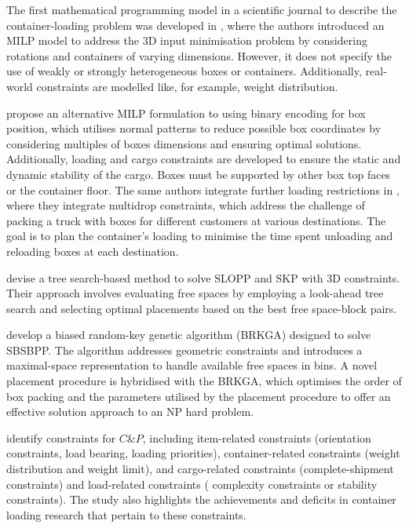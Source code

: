 The first mathematical programming model in a scientific journal to describe the container-loading problem was developed in \autocite{Chen1995EUROPEANProblem}, where the authors introduced an MILP model to address the 3D  input minimisation problem by considering rotations and containers of varying dimensions. However, it does not specify the use of weakly or strongly heterogeneous boxes or containers. Additionally, real-world constraints are modelled like, for example, weight distribution.

\autocite{Junqueira2012Three-dimensionalConstraints} propose an alternative MILP formulation to \autocite{Chen1995EUROPEANProblem} using binary encoding for box position, which utilises normal patterns to reduce possible box coordinates by considering multiples of boxes dimensions and ensuring optimal solutions. Additionally, loading and cargo constraints are developed to ensure the static and dynamic stability of the cargo. Boxes must be supported by other box top faces or the container floor. The same authors integrate further loading restrictions in \autocite{Junqueira2012MIP-basedConstraints}, where they integrate multidrop constraints, which address the challenge of packing a
truck with boxes for different customers at various destinations. The goal is to plan the container’s loading to minimise the time spent unloading and reloading boxes at each destination.

\autocite{Zhu2012AProblem} devise a tree search-based method to solve SLOPP and SKP with 3D constraints. Their approach involves evaluating free spaces by employing a look-ahead tree search and selecting optimal placements based on the best free space-block pairs.

\autocite{Goncalves2013AProblems} develop a biased random-key genetic algorithm (BRKGA) designed to solve SBSBPP. The algorithm addresses geometric constraints and introduces a maximal-space representation to handle available free spaces in bins. A novel placement procedure is hybridised with the BRKGA, which optimises the order of box packing and the parameters utilised by the placement procedure to offer an effective solution approach to an NP hard problem.

\autocite{Bortfeldt2013ConstraintsReview} identify constraints for $C\&P$, including item-related constraints (orientation constraints,   load bearing, loading priorities), container-related constraints (weight distribution and weight limit),  and cargo-related constraints (complete-shipment constraints) and load-related constraints ( complexity constraints or stability constraints). The study also highlights the achievements and deficits in container loading research that pertain to these constraints.

